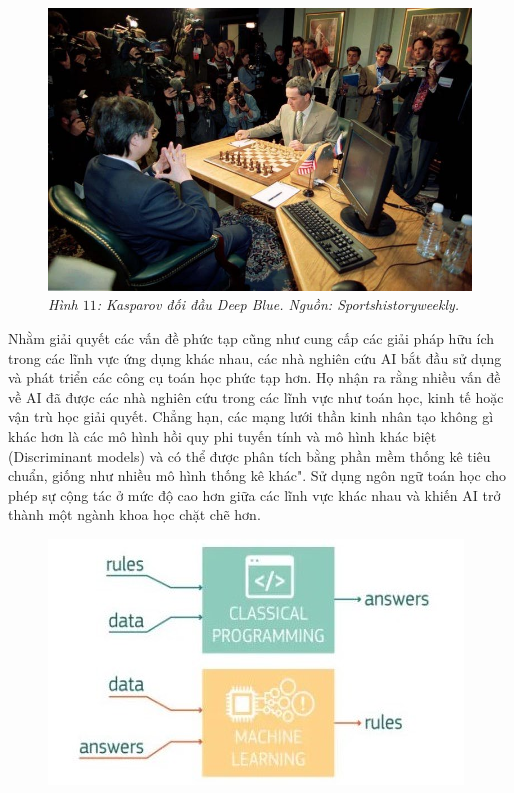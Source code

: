 \begin{multicols}{2}
	\begin{figure}[H]
		\vspace*{-5pt}
		\centering
		\captionsetup{labelformat= empty, justification=centering}
		\includegraphics[width= 1\linewidth]{DeepBlue.jpg}
		\caption{\small\textit{\color{cackithi}Hình $11$: Kasparov đối đầu Deep Blue. Nguồn: Sportshistoryweekly.}}
		\vspace*{-10pt}
	\end{figure}
	Nhằm giải quyết các vấn đề phức tạp cũng như cung cấp các giải pháp hữu ích trong các lĩnh vực ứng dụng khác nhau, các nhà nghiên cứu AI bắt đầu sử dụng và phát triển các công cụ toán học phức tạp hơn. Họ nhận ra rằng nhiều vấn đề về AI đã được các nhà nghiên cứu trong các lĩnh vực như toán học, kinh tế hoặc vận trù học giải quyết. Chẳng hạn, các mạng lưới thần kinh nhân tạo không gì khác hơn là các mô hình hồi quy phi tuyến tính và mô hình khác biệt (Discriminant models) và có thể được phân tích bằng phần mềm thống kê tiêu chuẩn, giống như nhiều mô hình thống kê khác". Sử dụng ngôn ngữ toán học cho phép sự cộng tác ở mức độ cao hơn giữa các lĩnh vực khác nhau và khiến AI trở thành một ngành khoa học chặt chẽ hơn.
	\begin{figure}[H]
		\vspace*{-5pt}
		\centering
		\captionsetup{labelformat= empty, justification=centering}
		\includegraphics[width= 0.9\linewidth]{ML-TraditionalProgramming.jpeg}

\end{figure}
\end{multicols}
